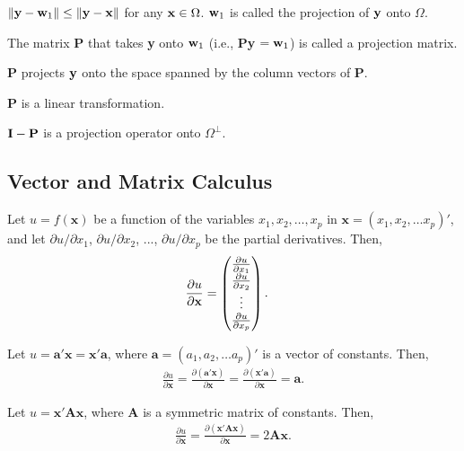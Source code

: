 \bstheo
$\|{\bf y}-{\bf w}_1\| \le \|{\bf y}-{\bf x}\|$ for any ${\bf x}\in
\Omega$.  ${\bf w}_1$ is called the projection of ${\bf y}$ onto
$\Omega$.
\estheo

\bdefi
The matrix {\bf P} that takes {\bf y} onto ${\bf w}_1$ (i.e., {\bf
P}{\bf y} $ = {\bf w}_1$) is called a projection matrix.
\edefi

\bstheo
{\bf P} projects ${\bf y}$ onto the space spanned by the column
vectors of {\bf P}.
\estheo

\bstheo
{\bf P} is a linear transformation.
\estheo

\bstheo
${\bf I}-{\bf P}$ is a projection operator onto $\Omega^{\perp}$.
\estheo


\newpage
\subsection{Vector and Matrix Calculus}

\bdefi
Let $u=f({\mathbf x})$ be a function of the variables $x_1, x_2, \ldots , x_p$ in ${\mathbf x} = (x_1, x_2, \ldots x_p)'$, and let ${\partial u}/{\partial x_1}$, ${\partial u}/{\partial x_2}$, ...,  ${\partial u}/{\partial x_p}$ be the partial derivatives. 
Then, %
\begin{align}
\frac{\partial u}{\partial {\bf x}} &=
\begin{pmatrix}
\frac{\partial u}{\partial x_1}\\ 
\frac{\partial u}{\partial x_2}\\
\vdots\\
\frac{\partial u}{\partial x_p}
\end{pmatrix}. \nonumber
\end{align}
\edefi

\bstheo
Let $u={\mathbf a}'{\mathbf x} = {\mathbf x}'{\mathbf a}$, where ${\mathbf a} = (a_1, a_2, \ldots a_p)'$ is a vector of constants. Then,
\begin{align}
\frac{\partial u}{\partial {\mathbf x}} = \frac{\partial ({\mathbf a}'{\mathbf x}) }{\partial {\mathbf x}} = \frac{\partial ({\mathbf x}'{\mathbf a}) }{\partial {\mathbf x}} ={\mathbf a}. \nonumber
\end{align}
\estheo

\vb

\bstheo
Let $u = {\mathbf x}'{\mathbf A}{\mathbf x}$, where ${\mathbf A}$ is a symmetric matrix of constants. Then,
\begin{align}
\frac{\partial u}{\partial {\mathbf x}} = \frac{\partial ({\mathbf x}'{\mathbf A}{\mathbf x}) }{\partial {\mathbf x}} =  2{\mathbf A}{\mathbf x}. \nonumber
\end{align}
\estheo


